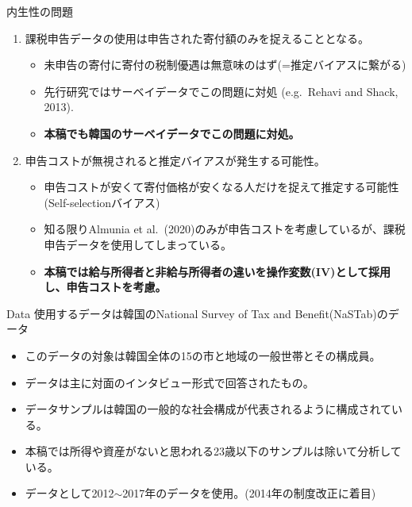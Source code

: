 \documentclass[dvipdfmx,10pt]{beamer}
\begin{document}
	\begin{frame}{内生性の問題}
		\begin{enumerate}
			\item 課税申告データの使用は申告された寄付額のみを捉えることとなる。
			\begin{itemize}
				\item 未申告の寄付に寄付の税制優遇は無意味のはず(=推定バイアスに繋がる)
				\item 先行研究ではサーベイデータでこの問題に対処 (e.g.~Rehavi and Shack, 2013).
				\item \textbf{本稿でも韓国のサーベイデータでこの問題に対処。}
			\end{itemize}
			\item 申告コストが無視されると推定バイアスが発生する可能性。
			\begin{itemize}
				\item 申告コストが安くて寄付価格が安くなる人だけを捉えて推定する可能性(Self-selectionバイアス)
				\item 知る限りAlmunia et al.~(2020)のみが申告コストを考慮しているが、課税申告データを使用してしまっている。
				\item\textbf{本稿では給与所得者と非給与所得者の違いを操作変数(IV)として採用し、申告コストを考慮。}
			\end{itemize}
		\end{enumerate}
	\end{frame}
	
	\begin{frame}{Data}
		使用するデータは韓国のNational Survey of Tax and Benefit(NaSTab)のデータ
		\begin{itemize}
			\item このデータの対象は韓国全体の15の市と地域の一般世帯とその構成員。
			\item データは主に対面のインタビュー形式で回答されたもの。
			\item データサンプルは韓国の一般的な社会構成が代表されるように構成されている。
			\item 本稿では所得や資産がないと思われる23歳以下のサンプルは除いて分析している。
			\item データとして2012$\sim$2017年のデータを使用。(2014年の制度改正に着目)
		\end{itemize}
	\end{frame}
\end{document}

